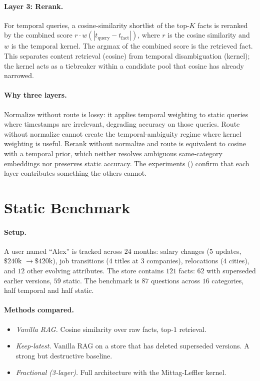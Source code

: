 \documentclass[11pt]{article}
\theoremstyle{plain}
\theoremstyle{definition}
\begin{document}
\paragraph{Layer 3: Rerank.}  For temporal queries, a
cosine-similarity shortlist of the top-$K$ facts is
reranked by the combined score
$r \cdot w(|t_\text{query} - t_\text{fact}|)$,
where $r$ is the cosine similarity and $w$ is the
temporal kernel.  The argmax of the combined score is
the retrieved fact.  This separates content retrieval
(cosine) from temporal disambiguation (kernel); the
kernel acts as a tiebreaker within a candidate pool
that cosine has already narrowed.

\paragraph{Why three layers.}  Normalize without route
is lossy: it applies temporal weighting to static
queries where timestamps are irrelevant, degrading
accuracy on those queries.  Route without normalize
cannot create the temporal-ambiguity regime where
kernel weighting is useful.  Rerank without normalize
and route is equivalent to cosine with a temporal prior,
which neither resolves ambiguous same-category
embeddings nor preserves static accuracy.  The
experiments () confirm that each
layer contributes something the others cannot.


\section{Static Benchmark}\label{sec:static}

\paragraph{Setup.}  A user named ``Alex'' is tracked
across $24$ months: salary changes ($5$ updates,
$\$240$k $\to \$420$k), job transitions ($4$ titles
at $3$ companies), relocations ($4$ cities), and $12$
other evolving attributes.  The store contains $121$
facts: $62$ with superseded earlier versions, $59$
static.  The benchmark is $87$ questions across $16$
categories, half temporal and half static.

\paragraph{Methods compared.}

\begin{itemize}[leftmargin=*]
\item \emph{Vanilla RAG.}  Cosine similarity over raw
  facts, top-$1$ retrieval.
\item \emph{Keep-latest.}  Vanilla RAG on a store
  that has deleted superseded versions.  A strong but
  destructive baseline.
\item \emph{Fractional (3-layer).}  Full architecture
  with the Mittag-Leffler kernel.
\end{itemize}
\end{document}
